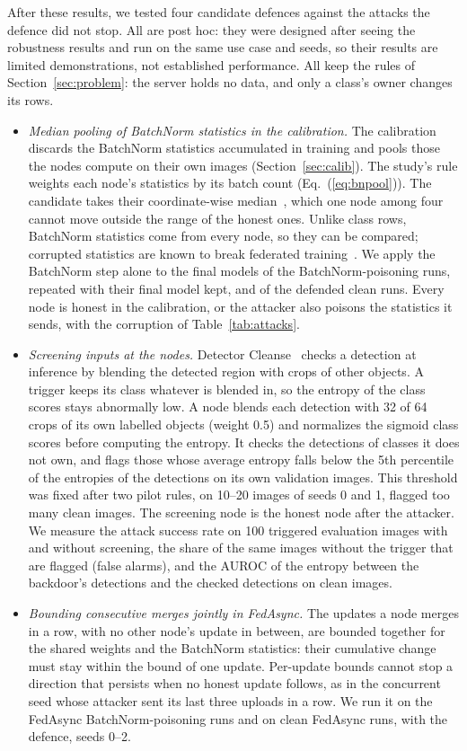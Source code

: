 \documentclass[pdflatex,sn-mathphys-num]{sn-jnl}
\begin{document}
After these results, we tested four candidate defences against the attacks the defence did not stop. All are post hoc: they were designed after seeing the robustness results and run on the same use case and seeds, so their results are limited demonstrations, not established performance. All keep the rules of Section~\ref{sec:problem}: the server holds no data, and only a class's owner changes its rows.
\begin{itemize}
\item \emph{Median pooling of BatchNorm statistics in the calibration.} The calibration discards the BatchNorm statistics accumulated in training and pools those the nodes compute on their own images (Section~\ref{sec:calib}). The study's rule weights each node's statistics by its batch count (Eq.~(\ref{eq:bnpool})). The candidate takes their coordinate-wise median~\cite{yin2018byzantine}, which one node among four cannot move outside the range of the honest ones. Unlike class rows, BatchNorm statistics come from every node, so they can be compared; corrupted statistics are known to break federated training~\cite{guerraoui2024bn}. We apply the BatchNorm step alone to the final models of the BatchNorm-poisoning runs, repeated with their final model kept, and of the defended clean runs. Every node is honest in the calibration, or the attacker also poisons the statistics it sends, with the corruption of Table~\ref{tab:attacks}.
\item \emph{Screening inputs at the nodes.} Detector Cleanse~\cite{chan2022baddet} checks a detection at inference by blending the detected region with crops of other objects. A trigger keeps its class whatever is blended in, so the entropy of the class scores stays abnormally low. A node blends each detection with 32 of 64 crops of its own labelled objects (weight 0.5) and normalizes the sigmoid class scores before computing the entropy. It checks the detections of classes it does not own, and flags those whose average entropy falls below the 5th percentile of the entropies of the detections on its own validation images. This threshold was fixed after two pilot rules, on 10--20 images of seeds 0 and 1, flagged too many clean images. The screening node is the honest node after the attacker. We measure the attack success rate on 100 triggered evaluation images with and without screening, the share of the same images without the trigger that are flagged (false alarms), and the AUROC of the entropy between the backdoor's detections and the checked detections on clean images.
\item \emph{Bounding consecutive merges jointly in FedAsync.} The updates a node merges in a row, with no other node's update in between, are bounded together for the shared weights and the BatchNorm statistics: their cumulative change must stay within the bound of one update. Per-update bounds cannot stop a direction that persists when no honest update follows, as in the concurrent seed whose attacker sent its last three uploads in a row. We run it on the FedAsync BatchNorm-poisoning runs and on clean FedAsync runs, with the defence, seeds 0--2.

\end{itemize}
\end{document}
